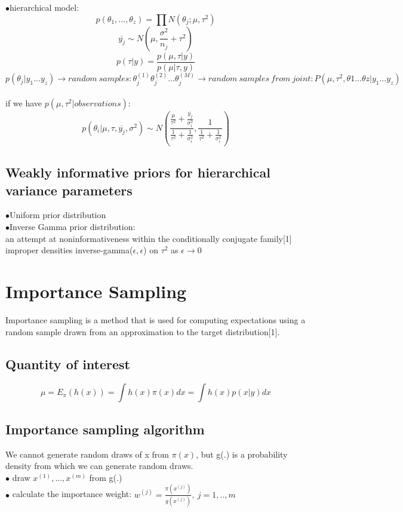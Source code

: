 \documentclass[twoside]{article}
\begin{document}
$\bullet$hierarchical model:
$$p(\theta_1,...,\theta_z) = \prod N(\theta_j;\mu,\tau^2)$$
$$\overline{y_j}\sim N(\mu,\frac{\sigma^2}{n_j}+\tau^2) $$
$$p(\tau|y)=\frac{p(\mu,\tau|y)}{p(\mu|\tau,y)}$$
$$p(\theta_j|y_1...y_z) \rightarrow random\ samples:\theta^{(1)}_j \theta^{(2)}_j ... \theta^{(M)}_j \rightarrow random\ samples\ from\ joint: P(\mu,\tau^2,\theta1...\theta z|y_1...y_z)$$ \\
if we have $p(\mu,\tau^2|observations)$:
$$p(\theta_i|\mu,\tau,\overline{y_j},\sigma^2) \sim N(\frac{\frac{\mu}{\tau^2}+\frac{\overline{y_j}}{\sigma^2_i}}{\frac{1}{\tau^2}+\frac{1}{\sigma^2_i}},\frac{1}{\frac{1}{\tau^2}+\frac{1}{\sigma^2_i}})$$

\subsection{Weakly informative priors for hierarchical variance parameters}
$\bullet$Uniform prior distribution\\
$\bullet$Inverse Gamma prior distribution:\\
\hspace*{0.1cm} an attempt at noninformativeness within the conditionally conjugate family[1] \\
\hspace*{0.1cm} improper densities inverse-gamma($\epsilon,\epsilon$) on $\tau^2$ as $\epsilon \rightarrow 0$ 


\section{Importance Sampling} 
Importance sampling is a method that is used for computing expectations using a random sample drawn from an approximation to the target distribution[1].
\subsection{Quantity of interest}
$$\mu=E_\pi(h(x))=\int h(x)\pi(x) dx=\int h(x)p(x|y)dx$$

\subsection{Importance sampling algorithm}
We cannot generate random draws of x from $\pi(x)$, but g(.) is a probability density from which we can generate random draws.\\
$\bullet$ draw $x^{(1)},...,x^{(m)}$ from g(.)\\
$\bullet$ calculate the importance weight: $w^{(j)}=\frac{\pi(x^{(j)})}{g(x^{(j)})},\ j=1,..,m$\\
\end{document}
